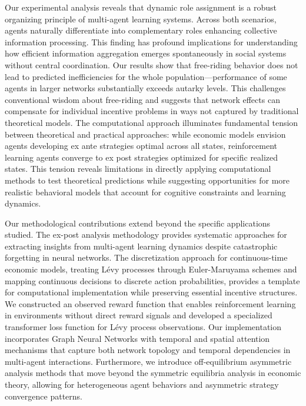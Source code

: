 Our experimental analysis reveals that dynamic role assignment is a robust organizing principle of multi-agent learning systems. Across both scenarios, agents naturally differentiate into complementary roles enhancing collective information processing. This finding has profound implications for understanding how efficient information aggregation emerges spontaneously in social systems without central coordination.
Our results show that free-riding behavior does not lead to predicted inefficiencies for the whole population—performance of some agents in larger networks substantially exceeds autarky levels. This challenges conventional wisdom about free-riding and suggests that network effects can compensate for individual incentive problems in ways not captured by traditional theoretical models.
The computational approach illuminates fundamental tension between theoretical and practical approaches: while economic models envision agents developing ex ante strategies optimal across all states, reinforcement learning agents converge to ex post strategies optimized for specific realized states. This tension reveals limitations in directly applying computational methods to test theoretical predictions while suggesting opportunities for more realistic behavioral models that account for cognitive constraints and learning dynamics.

Our methodological contributions extend beyond the specific applications studied. The ex-post analysis methodology provides systematic approaches for extracting insights from multi-agent learning dynamics despite catastrophic forgetting in neural networks. The discretization approach for continuous-time economic models, treating Lévy processes through Euler-Maruyama schemes and mapping continuous decisions to discrete action probabilities, provides a template for computational implementation while preserving essential incentive structures. We constructed an observed reward function that enables reinforcement learning in environments without direct reward signals and developed a specialized transformer loss function for Lévy process observations. Our implementation incorporates Graph Neural Networks with temporal and spatial attention mechanisms that capture both network topology and temporal dependencies in multi-agent interactions. Furthermore, we introduce off-equilibrium asymmetric analysis methods that move beyond the symmetric equilibria analysis in economic theory, allowing for heterogeneous agent behaviors and asymmetric strategy convergence patterns.

